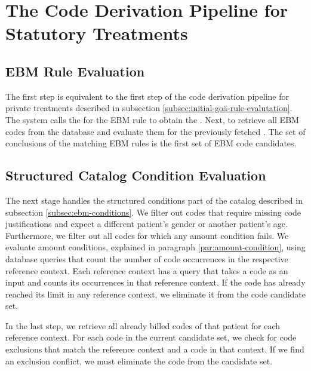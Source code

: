 \section{The Code Derivation Pipeline for Statutory Treatments}\label{sec:the-code-derivation-pipeline-for-statutory-treatments}

\subsection{EBM Rule Evaluation}\label{subsec:rule-evaluation}
The first step is equivalent to the first step of the code derivation pipeline for private treatments
described in subsection \ref{subsec:initial-goä-rule-evalutation}.
The system calls the \REIF for the EBM rule to obtain the \REI.
Next,  to retrieve all EBM codes from the database and evaluate them for the previously fetched \REI.
The set of conclusions of the matching EBM rules is the first set of EBM code candidates.

\subsection{Structured Catalog Condition Evaluation}\label{subsec:structured-catalog-condition-evaluation}
The next stage handles the structured conditions part of the catalog described in subsection \ref{subsec:ebm-conditions}.
We filter out codes that require missing code justifications and expect a different patient's gender or another patient's age.
Furthermore, we filter out all codes for which any amount condition fails.
We evaluate amount conditions, explained in paragraph \ref{par:amount-condition},
using database queries that count the number of code occurrences in the respective reference context.
Each reference context has a query that takes a code as an input and counts its occurrences in that reference context.
If the code has already reached its limit in any reference context, we eliminate it from the code candidate set.

In the last step, we retrieve all already billed codes of that patient for each reference context.
For each code in the current candidate set, we check for code exclusions that match the reference context and a code in that context.
If we find an exclusion conflict, we must eliminate the code from the candidate set.
